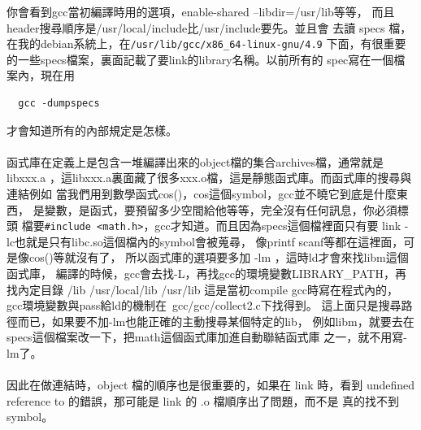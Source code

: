   你會看到gcc當初編譯時用的選項，enable-shared --libdir=/usr/lib等等，
  而且header搜尋順序是/usr/local/include比/usr/include要先。並且會
  去讀 specs 檔，在我的debian系統上，在\verb=/usr/lib/gcc/x86_64-linux-gnu/4.9=
  下面，有很重要的一些specs檔案，裏面記載了要link的library名稱。以前所有的
  spec寫在一個檔案內，現在用
  \begin{verbatim}
  gcc -dumpspecs
  \end{verbatim}
  才會知道所有的內部規定是怎樣。
  \\\\
  函式庫在定義上是包含一堆編譯出來的object檔的集合archives檔，通常就是libxxx.a
  ，這libxxx.a裏面藏了很多xxx.o檔，這是靜態函式庫。而函式庫的搜尋與連結例如
  當我們用到數學函式cos()，cos這個symbol，gcc並不曉它到底是什麼東西，
  是變數，是函式，要預留多少空間給他等等，完全沒有任何訊息，你必須標頭
  檔要\verb=#include <math.h>=，gcc才知道。而且因為specs這個檔裡面只有要
  link -lc也就是只有libc.so這個檔內的symbol會被蒐尋，
  像printf scanf等都在這裡面，可是像cos()等就沒有了，
  所以函式庫的選項要多加 -lm ，這時ld才會來找libm這個函式庫，
  編譯的時候，gcc會去找-L，再找gcc的環境變數LIBRARY\_PATH，再找內定目錄
  /lib /usr/local/lib /usr/lib 這是當初compile gcc時寫在程式內的，
  gcc環境變數與pass給ld的機制在~gcc/gcc/collect2.c下找得到。
  這上面只是搜尋路徑而已，如果要不加-lm也能正確的主動搜尋某個特定的lib，
  例如libm，就要去在specs這個檔案改一下，把math這個函式庫加進自動聯結函式庫
  之一，就不用寫-lm了。
  \\\\
  因此在做連結時，object 檔的順序也是很重要的，如果在 link 時，看到
  undefined reference to 的錯誤，那可能是  link 的 .o 檔順序出了問題，而不是
  真的找不到 symbol。

